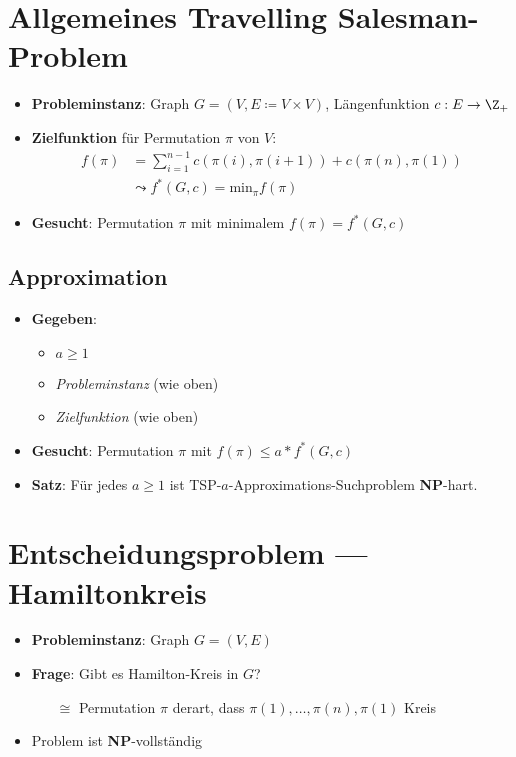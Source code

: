 \section{Allgemeines Travelling Salesman-Problem}

\begin{itemize}
  \item \textbf{Probleminstanz}: Graph $ G = (V, E \coloneqq V \times V) $, Längenfunktion $ c: E \to \Z_+ $
  \item \textbf{Zielfunktion} für Permutation $ \pi $ von $ V $:
  \begin{align*}
    f(\pi) &= \textstyle\sum_{i=1}^{ n-1 }c(\pi(i), \pi(i+1)) + c(\pi(n),\pi(1)) \\
     &\leadsto f^*(G,c) = \text{min}_\pi f(\pi)
  \end{align*}
  \item \textbf{Gesucht}: Permutation $ \pi $ mit minimalem $ f(\pi) = f^*(G,c) $
\end{itemize}

\subsection{Approximation}

\begin{itemize}
  \item \textbf{Gegeben}:
  \begin{itemize}
    \item $ a \geq 1 $
    \item \emph{Probleminstanz} (wie oben)
    \item \emph{Zielfunktion} (wie oben)
  \end{itemize}
  \item \textbf{Gesucht}: Permutation $ \pi $ mit $ f(\pi) \leq a*f^*(G,c) $
  \item \textbf{Satz}: Für jedes $ a \geq 1 $ ist TSP-$ a $-Approximations-Suchproblem \textbf{NP}-hart.
\end{itemize}

\section{Entscheidungsproblem --- Hamiltonkreis}

\begin{itemize}
  \item \textbf{Probleminstanz}: Graph $ G = (V,E) $
  \item \textbf{Frage}: Gibt es Hamilton-Kreis in $ G $?
  \begin{itemize}
    \item[$ \cong $] Permutation $ \pi $ derart, dass $ \pi(1), \dots,\pi(n),\pi(1) $ Kreis
  \end{itemize}
  \item Problem ist \textbf{NP}-vollständig
\end{itemize}

